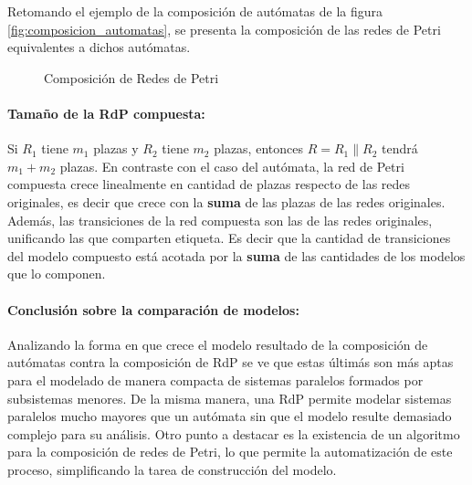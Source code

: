 Retomando el ejemplo de la composición de autómatas de la figura
\ref{fig:composicion_automatas}, se presenta la composición de las redes de
Petri equivalentes a dichos autómatas.

\begin{figure}[h]
  \centering
  \caption{Composición de Redes de Petri}
  \label{fig:composicion_petri}
\end{figure}

\paragraph{Tamaño de la RdP compuesta:}
Si $R_{1}$ tiene $m_{1}$ plazas y $R_{2}$ tiene $m_{2}$ plazas, entonces $R =
R_{1} \parallel R_{2}$ tendrá $m_{1} + m_{2}$ plazas.
En contraste con el caso del autómata, la red de Petri compuesta crece
linealmente en cantidad de plazas respecto de las redes originales, es decir que
crece con la \textbf{suma} de las plazas de las redes originales.
Además, las transiciones de la red compuesta son las de las redes originales,
unificando las que comparten etiqueta. Es decir que la cantidad de transiciones
del modelo compuesto está acotada por la \textbf{suma} de las cantidades de los
modelos que lo componen.

\paragraph{Conclusión sobre la comparación de modelos:}
Analizando la forma en que crece el modelo resultado de	 la composición de
autómatas contra la composición de RdP se ve que estas últimás son más aptas para el modelado de
manera compacta de sistemas paralelos formados por subsistemas menores.
De la misma manera, una RdP permite modelar sistemas paralelos mucho mayores que
un autómata sin que el modelo resulte demasiado complejo para su análisis.
Otro punto a destacar es la existencia de un algoritmo para la composición de
redes de Petri, lo que permite la automatización de este proceso, simplificando
la tarea de construcción del modelo.
